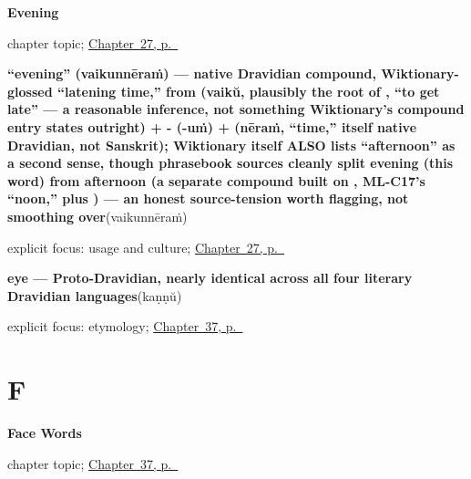 \noindent\begin{minipage}[t]{\linewidth}
\raggedright
\textbf{Evening}\par
\footnotesize chapter topic; \hyperref[ch:ml-evening]{Chapter~27, p.~\pageref*{ch:ml-evening}}
\end{minipage}\par\smallskip

\noindent\begin{minipage}[t]{\linewidth}
\raggedright
\textbf{\textquotedblleft{}evening\textquotedblright{} (vaikunnēraṁ) — native Dravidian compound, Wiktionary-glossed \textquotedblleft{}latening time,\textquotedblright{} from  (vaikŭ, plausibly the root of , \textquotedblleft{}to get late\textquotedblright{} — a reasonable inference, not something Wiktionary's compound entry states outright) + - (-uṁ) +  (nēraṁ, \textquotedblleft{}time,\textquotedblright{} itself native Dravidian, not Sanskrit); Wiktionary itself ALSO lists \textquotedblleft{}afternoon\textquotedblright{} as a second sense, though phrasebook sources cleanly split evening (this word) from afternoon (a separate compound built on , ML-C17's \textquotedblleft{}noon,\textquotedblright{} plus ) — an honest source-tension worth flagging, not smoothing over}\enspace\emph{}\enspace(vaikunnēraṁ)\par
\footnotesize explicit focus: usage and culture; \hyperref[ch:ml-evening]{Chapter~27, p.~\pageref*{ch:ml-evening}}
\end{minipage}\par\smallskip

\noindent\begin{minipage}[t]{\linewidth}
\raggedright
\textbf{eye — Proto-Dravidian, nearly identical across all four literary Dravidian languages}\enspace\emph{}\enspace(kaṇṇŭ)\par
\footnotesize explicit focus: etymology; \hyperref[ch:ml-face-words]{Chapter~37, p.~\pageref*{ch:ml-face-words}}
\end{minipage}\par\smallskip

\section*{F}

\noindent\begin{minipage}[t]{\linewidth}
\raggedright
\textbf{Face Words}\par
\footnotesize chapter topic; \hyperref[ch:ml-face-words]{Chapter~37, p.~\pageref*{ch:ml-face-words}}
\end{minipage}\par\smallskip

